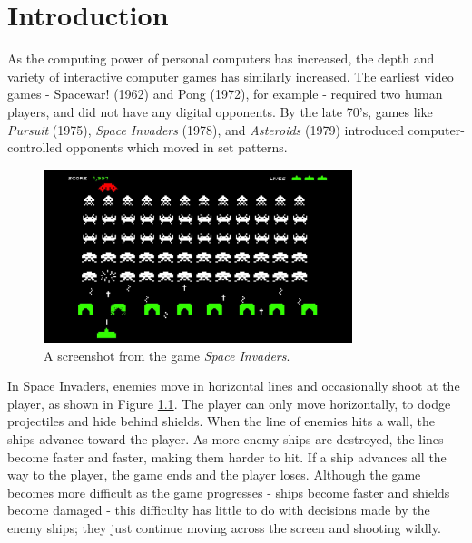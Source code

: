 \chapter{Introduction}
As the computing power of personal computers has increased, the depth and variety of interactive computer games has similarly increased. The earliest video games - Spacewar! (1962) and Pong (1972), for example - required two human players, and did not have any digital opponents. By the late 70's, games like \textit{Pursuit} (1975), \textit{Space Invaders} (1978), and \textit{Asteroids} (1979) introduced computer-controlled opponents which moved in set patterns.\\

\begin{figure}[H]
  \centering
  \includegraphics[width=9cm]{figures/space-invaders.jpg}
  \caption{A screenshot from the game \textit{Space Invaders}.}
  \label{fig:SpaceInvaders}
\end{figure}

In Space Invaders, enemies move in horizontal lines and occasionally shoot at the player, as shown in Figure \ref{fig:SpaceInvaders}. The player can only move horizontally, to dodge projectiles and hide behind shields. When the line of enemies hits a wall, the ships advance toward the player. As more enemy ships are destroyed, the lines become faster and faster, making them harder to hit. If a ship advances all the way to the player, the game ends and the player loses. Although the game becomes more difficult as the game progresses - ships become faster and shields become damaged - this difficulty has little to do with decisions made by the enemy ships; they just continue moving across the screen and shooting wildly.\\

